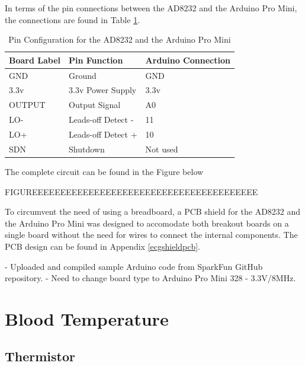 In terms of the pin connections between the AD8232 and the Arduino Pro Mini, the connections are found in Table \ref{ad8232pinconfigurationtable}.

\begin{table}[H]
	\centering
	\caption{Pin Configuration for the AD8232 and the Arduino Pro Mini \cite{ad8232}}
	\label{ad8232pinconfigurationtable}
	\begin{tabular}{|l|l|l|}
		\hline
		\textbf{Board Label} & \textbf{Pin Function} & \textbf{Arduino Connection} \\ \hline
		GND                  & Ground                & GND                         \\ \hline
		3.3v                 & 3.3v Power Supply     & 3.3v                        \\ \hline
		OUTPUT               & Output Signal         & A0                          \\ \hline
		LO-                  & Leads-off Detect -    & 11                          \\ \hline
		LO+                  & Leads-off Detect +    & 10                          \\ \hline
		SDN                  & Shutdown              & Not used                    \\ \hline
	\end{tabular}
\end{table}


The complete circuit can be found in the Figure below 

FIGUREEEEEEEEEEEEEEEEEEEEEEEEEEEEEEEEEEEEEEEE

To circumvent the need of using a breadboard, a PCB shield for the AD8232 and the Arduino Pro Mini was designed to accomodate both breakout boards on a single board without the need for wires to connect the internal components. The PCB design can be found in Appendix \ref{ecgshieldpcb}. 

- Uploaded and compiled sample Arduino code from SparkFun GitHub repository. 
- Need to change board type to Arduino Pro Mini 328 - 3.3V/8MHz. 



\section{Blood Temperature}

\subsection{Thermistor}

